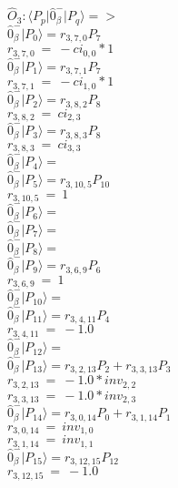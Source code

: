 \documentclass[14pt]{article}
\begin{document}
    $\hat{O}_{3}:  \langle{P_p}\vert \hat{0}_{\beta}^{-} \vert{P_q}\rangle => $ \\ 
    $ \hat{0}_{\beta}^{-} \vert{P_{0}}\rangle = {r}_{3,7,0}P_{7} $ \\ 
    ${r}_{3,7,0}\ =\ -{ci}_{0,0}*1 $ \\ 
    $ \hat{0}_{\beta}^{-} \vert{P_{1}}\rangle = {r}_{3,7,1}P_{7} $ \\ 
    ${r}_{3,7,1}\ =\ -{ci}_{1,0}*1 $ \\ 
    $ \hat{0}_{\beta}^{-} \vert{P_{2}}\rangle = {r}_{3,8,2}P_{8} $ \\ 
    ${r}_{3,8,2}\ =\ {ci}_{2,3} $ \\ 
    $ \hat{0}_{\beta}^{-} \vert{P_{3}}\rangle = {r}_{3,8,3}P_{8} $ \\ 
    ${r}_{3,8,3}\ =\ {ci}_{3,3} $ \\ 
    $ \hat{0}_{\beta}^{-} \vert{P_{4}}\rangle =  $ \\ 
    $ \hat{0}_{\beta}^{-} \vert{P_{5}}\rangle = {r}_{3,10,5}P_{10} $ \\ 
    ${r}_{3,10,5}\ =\ 1 $ \\ 
    $ \hat{0}_{\beta}^{-} \vert{P_{6}}\rangle =  $ \\ 
    $ \hat{0}_{\beta}^{-} \vert{P_{7}}\rangle =  $ \\ 
    $ \hat{0}_{\beta}^{-} \vert{P_{8}}\rangle =  $ \\ 
    $ \hat{0}_{\beta}^{-} \vert{P_{9}}\rangle = {r}_{3,6,9}P_{6} $ \\ 
    ${r}_{3,6,9}\ =\ 1 $ \\ 
    $ \hat{0}_{\beta}^{-} \vert{P_{10}}\rangle =  $ \\ 
    $ \hat{0}_{\beta}^{-} \vert{P_{11}}\rangle = {r}_{3,4,11}P_{4} $ \\ 
    ${r}_{3,4,11}\ =\ -1.0 $ \\ 
    $ \hat{0}_{\beta}^{-} \vert{P_{12}}\rangle =  $ \\ 
    $ \hat{0}_{\beta}^{-} \vert{P_{13}}\rangle = {r}_{3,2,13}P_{2}+{r}_{3,3,13}P_{3} $ \\ 
    ${r}_{3,2,13}\ =\ -1.0*{inv}_{2,2} $ \\ 
    ${r}_{3,3,13}\ =\ -1.0*{inv}_{2,3} $ \\ 
    $ \hat{0}_{\beta}^{-} \vert{P_{14}}\rangle = {r}_{3,0,14}P_{0}+{r}_{3,1,14}P_{1} $ \\ 
    ${r}_{3,0,14}\ =\ {inv}_{1,0} $ \\ 
    ${r}_{3,1,14}\ =\ {inv}_{1,1} $ \\ 
    $ \hat{0}_{\beta}^{-} \vert{P_{15}}\rangle = {r}_{3,12,15}P_{12} $ \\ 
    ${r}_{3,12,15}\ =\ -1.0 $ \\ 
    
\end{document}
